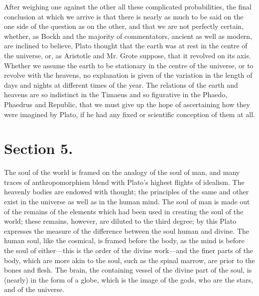 \documentclass[11pt,letter]{article}
\begin{document}
\par  After weighing one against the other all these complicated probabilities, the final conclusion at which we arrive is that there is nearly as much to be said on the one side of the question as on the other, and that we are not perfectly certain, whether, as Bockh and the majority of commentators, ancient as well as modern, are inclined to believe, Plato thought that the earth was at rest in the centre of the universe, or, as Aristotle and Mr. Grote suppose, that it revolved on its axis. Whether we assume the earth to be stationary in the centre of the universe, or to revolve with the heavens, no explanation is given of the variation in the length of days and nights at different times of the year. The relations of the earth and heavens are so indistinct in the Timaeus and so figurative in the Phaedo, Phaedrus and Republic, that we must give up the hope of ascertaining how they were imagined by Plato, if he had any fixed or scientific conception of them at all.

\par 
\section{
      Section 5.
    }
\par  The soul of the world is framed on the analogy of the soul of man, and many traces of anthropomorphism blend with Plato’s highest flights of idealism. The heavenly bodies are endowed with thought; the principles of the same and other exist in the universe as well as in the human mind. The soul of man is made out of the remains of the elements which had been used in creating the soul of the world; these remains, however, are diluted to the third degree; by this Plato expresses the measure of the difference between the soul human and divine. The human soul, like the cosmical, is framed before the body, as the mind is before the soul of either—this is the order of the divine work—and the finer parts of the body, which are more akin to the soul, such as the spinal marrow, are prior to the bones and flesh. The brain, the containing vessel of the divine part of the soul, is (nearly) in the form of a globe, which is the image of the gods, who are the stars, and of the universe.
\end{document}
